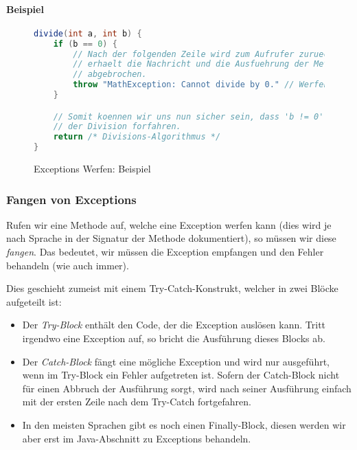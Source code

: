 		\paragraph{Beispiel}
			\begin{figure}[H]
				\centering
				\begin{lstlisting}[language = Java, style = base]
divide(int a, int b) {
	if (b == 0) {
		// Nach der folgenden Zeile wird zum Aufrufer zurueck gekehrt, dieser
		// erhaelt die Nachricht und die Ausfuehrung der Methode wird
		// abgebrochen.
		throw "MathException: Cannot divide by 0." // Werfen der Exception.
	}

	// Somit koennen wir uns nun sicher sein, dass 'b != 0' gilt und einfach mit
	// der Division forfahren.
	return /* Divisions-Algorithmus */
}
				\end{lstlisting}
				\caption{Exceptions Werfen: Beispiel}
				\label{fig:throw_exceptions}
			\end{figure}
	
	\subsubsection{Fangen von Exceptions}
		Rufen wir eine Methode auf, welche eine Exception werfen kann (dies wird je nach Sprache in der Signatur der Methode dokumentiert), so müssen wir diese \textit{fangen}. Das bedeutet, wir müssen die Exception empfangen und den Fehler behandeln (wie auch immer).
		
		Dies geschieht zumeist mit einem Try-Catch-Konstrukt, welcher in zwei Blöcke aufgeteilt ist:
		\begin{itemize}
			\item Der \textit{Try-Block} enthält den Code, der die Exception auslösen kann. Tritt irgendwo eine Exception auf, so bricht die Ausführung dieses Blocks ab.
			\item Der \textit{Catch-Block} fängt eine mögliche Exception und wird nur ausgeführt, wenn im Try-Block ein Fehler aufgetreten ist. Sofern der Catch-Block nicht für einen Abbruch der Ausführung sorgt, wird nach seiner Ausführung einfach mit der ersten Zeile nach dem Try-Catch fortgefahren.
			\item In den meisten Sprachen gibt es noch einen Finally-Block, diesen werden wir aber erst im Java-Abschnitt zu Exceptions behandeln.
		\end{itemize}
		
